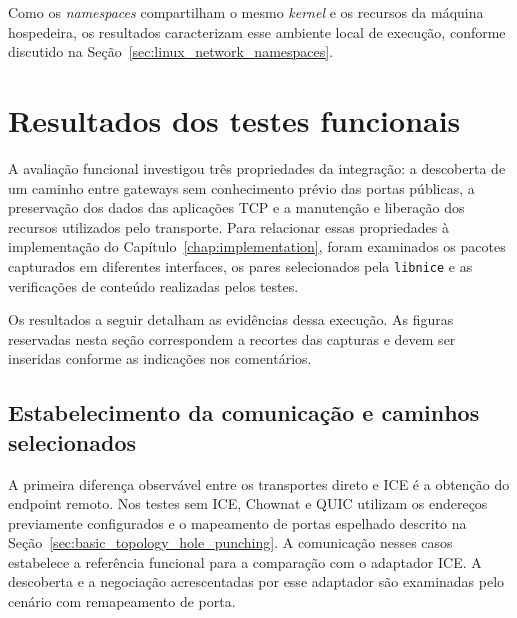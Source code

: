 Como os \textit{namespaces} compartilham o mesmo \textit{kernel} e os recursos da máquina hospedeira, os resultados caracterizam esse ambiente local de execução, conforme discutido na Seção~\ref{sec:linux_network_namespaces}.









\section{Resultados dos testes funcionais}
\label{sec:functional_results}

A avaliação funcional investigou três propriedades da integração:
a descoberta de um caminho entre gateways sem conhecimento prévio
das portas públicas, a preservação dos dados das aplicações TCP e
a manutenção e liberação dos recursos utilizados pelo transporte.
Para relacionar essas propriedades à implementação do
Capítulo~\ref{chap:implementation}, foram examinados os pacotes
capturados em diferentes interfaces, os pares selecionados pela
\texttt{libnice} e as verificações de conteúdo realizadas pelos testes.

Os resultados a seguir detalham as evidências dessa execução.
As figuras reservadas nesta seção correspondem a recortes das
capturas e devem ser inseridas conforme as indicações nos comentários.


\subsection{Estabelecimento da comunicação e caminhos selecionados}
\label{sec:functional_establishment}

A primeira diferença observável entre os transportes direto e ICE
é a obtenção do endpoint remoto. Nos testes sem ICE, Chownat e QUIC
utilizam os endereços previamente configurados e o mapeamento de
portas espelhado descrito na
Seção~\ref{sec:basic_topology_hole_punching}. A comunicação nesses
casos estabelece a referência funcional para a comparação com o
adaptador ICE. A descoberta e a negociação acrescentadas por esse
adaptador são examinadas pelo cenário com remapeamento de porta.

